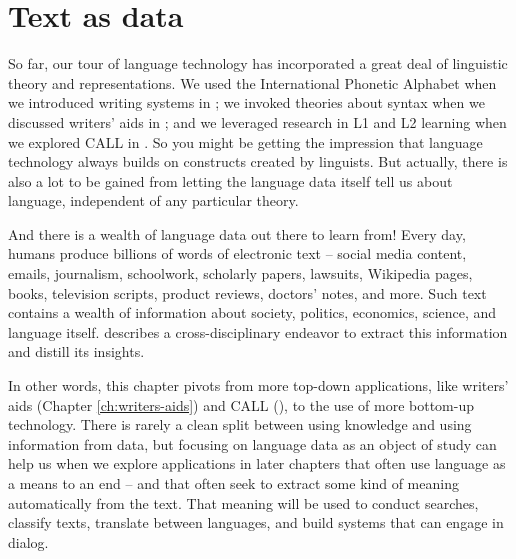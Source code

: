 \chapter{Text as data}
\label{ch:textasdata}

So far, our tour of language technology has incorporated a great deal of linguistic theory and representations.  We used the International Phonetic Alphabet when we introduced writing systems in ; we invoked theories about syntax when we discussed writers' aids in ; and we leveraged research in L1 and L2 learning when we explored CALL in .  So you might be getting the impression that language technology always builds on  constructs created by linguists.  But actually, there is also a lot to be gained from letting the language data itself tell us about language, independent of any particular theory.

And there is a wealth of language data out there to learn from!
Every day, humans produce billions of words of
electronic text -- social media content, emails, journalism,
schoolwork, scholarly papers, lawsuits, Wikipedia pages, books,
television scripts, product reviews, doctors' notes, and more.  Such
text contains a wealth of information about society, politics,
economics, science, and language itself.  describes a cross-disciplinary endeavor to extract this
information and distill its insights.

In other words, this chapter  pivots from more top-down
 applications, like writers' aids (Chapter
\ref{ch:writers-aids}) and CALL (), to the use of
more bottom-up  technology. There is rarely a clean split
between using knowledge and using information from data,
but focusing on language data as an object of study can help us when
we explore applications in later chapters that often use
language as a means to an end -- and that often seek to extract some
kind of meaning automatically from the text.  That meaning will be used to conduct searches, classify texts, translate between languages, and build
systems that can engage in dialog. %



